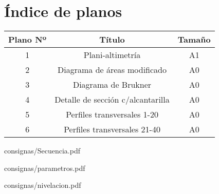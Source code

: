 \documentclass[a4paper]{article}
\begin{document}


\tableofcontents

\section*{Índice de planos}


\begin{center}
\begin{tabular}{|c|c|c|}
\hline
    Plano Nº & Título & Tamaño\\
    \hline \hline
    1 & Plani-altimetría & A1 \\
    \hline
    2 & Diagrama de áreas modificado & A0 \\
    \hline
    3 & Diagrama de Brukner & A0 \\
    \hline
    4 & Detalle de sección c/alcantarilla & A0 \\
    \hline
    5 & Perfiles transversales 1-20 & A0 \\
    \hline
    6 & Perfiles transversales 21-40 & A0 \\
    \hline    
\end{tabular}
\end{center}


     {consignas/Secuencia.pdf}       
            

     {consignas/parametros.pdf}
     

     {consignas/nivelacion.pdf} 

\clearpage



\clearpage








\clearpage
{}
\printbibliography[title={Bibliografia}]
\end{document}
